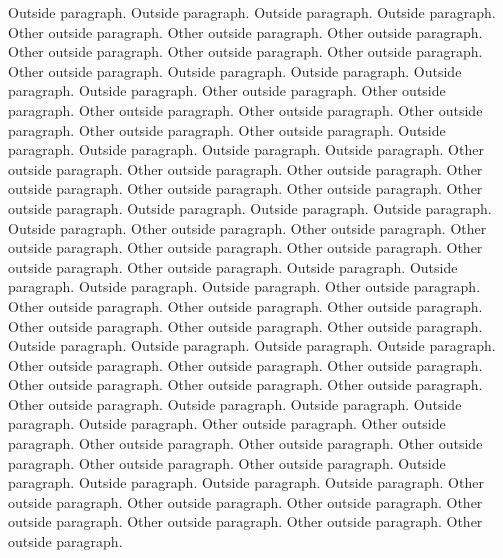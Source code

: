 \documentclass{article}
\begin{document}
\begin{pairs}
\begin{Rightside}
            \pend
                        \pstart
                Outside paragraph. Outside paragraph. Outside paragraph. Outside paragraph.
            \pend
            \pstart
                Other outside paragraph. Other outside paragraph. Other outside paragraph. Other outside paragraph. Other outside paragraph. Other outside paragraph. Other outside paragraph.
            \pend
                        \pstart
                Outside paragraph. Outside paragraph. Outside paragraph. Outside paragraph.
            \pend
            \pstart
                Other outside paragraph. Other outside paragraph. Other outside paragraph. Other outside paragraph. Other outside paragraph. Other outside paragraph. Other outside paragraph.
            \pend
                        \pstart
                Outside paragraph. Outside paragraph. Outside paragraph. Outside paragraph.
            \pend
            \pstart
                Other outside paragraph. Other outside paragraph. Other outside paragraph. Other outside paragraph. Other outside paragraph. Other outside paragraph. Other outside paragraph.
            \pend
                        \pstart
                Outside paragraph. Outside paragraph. Outside paragraph. Outside paragraph.
            \pend
            \pstart
                Other outside paragraph. Other outside paragraph. Other outside paragraph. Other outside paragraph. Other outside paragraph. Other outside paragraph. Other outside paragraph.
            \pend
                        \pstart
                Outside paragraph. Outside paragraph. Outside paragraph. Outside paragraph.
            \pend
            \pstart
                Other outside paragraph. Other outside paragraph. Other outside paragraph. Other outside paragraph. Other outside paragraph. Other outside paragraph. Other outside paragraph.
            \pend
                        \pstart
                Outside paragraph. Outside paragraph. Outside paragraph. Outside paragraph.
            \pend
            \pstart
                Other outside paragraph. Other outside paragraph. Other outside paragraph. Other outside paragraph. Other outside paragraph. Other outside paragraph. Other outside paragraph.
            \pend
                        \pstart
                Outside paragraph. Outside paragraph. Outside paragraph. Outside paragraph.
            \pend
            \pstart
                Other outside paragraph. Other outside paragraph. Other outside paragraph. Other outside paragraph. Other outside paragraph. Other outside paragraph. Other outside paragraph.
            \pend
                        \pstart
                Outside paragraph. Outside paragraph. Outside paragraph. Outside paragraph.
            \pend
            \pstart
                Other outside paragraph. Other outside paragraph. Other outside paragraph. Other outside paragraph. Other outside paragraph. Other outside paragraph. Other outside paragraph.
            \pend
        \endnumbering
    \end{Rightside}

\end{pairs}
\Columns
\end{document}
